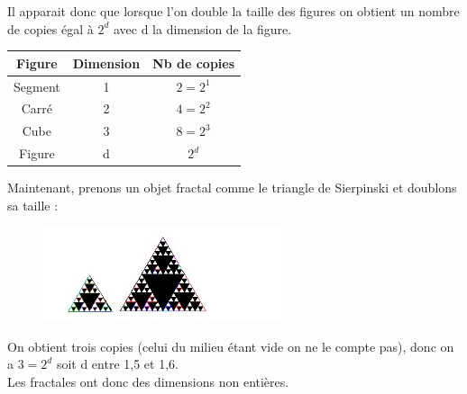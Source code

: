 \documentclass[a4paper]{article}
\begin{document}
Il apparait donc que lorsque l'on double la taille des figures on obtient un nombre de copies égal à \begin{math} 2^{d} \end{math} avec d la dimension de la figure. \\
\begin{center}
\begin{tabular}{|c|c|c|} 
\hline
Figure & Dimension & Nb de copies \\
\hline
Segment & 1 & \begin{math} 2 = 2^1 \end{math} \\
Carré & 2 & \begin{math} 4 = 2^2 \end{math}\\
Cube & 3 &  \begin{math} 8 = 2^3 \end{math}\\
Figure & d & \begin{math} 2^{d} \end{math}\\
\hline
\end{tabular}
\end{center}
Maintenant, prenons un objet fractal comme le triangle de Sierpinski et doublons sa taille :

\begin{figure}[H]
\begin{center}
\includegraphics[width=7cm]{tri.jpg}
\end{center}
\end{figure}

On obtient trois copies (celui du milieu étant vide on ne le compte pas), donc on a \begin{math} 3 = 2^{d} \end{math} soit d entre 1,5 et 1,6.\\

Les fractales ont donc des dimensions non entières.
\end{document}
